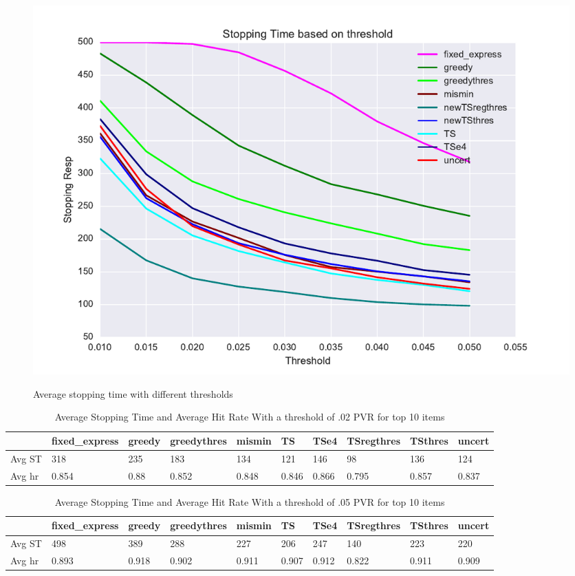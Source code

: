 \documentclass[a4paper,12pt]{article}
\begin{document}
\begin{figure}
\caption{Average stopping time with different thresholds}
\includegraphics[width=1\textwidth]{plots/stoppingtimes.pdf}
\label{fig:st}
\end{figure}
\begin{table}
\begin{center}
\begin{tabular}{llllllllll}
\hline    &  fixed\_express &  greedy &  greedythres &  mismin &    TS &  TSe4 &  TSregthres &  TSthres &  uncert \\\hline  Avg ST  & 318 &   235 & 183 & 134 & 121 & 146 & 	98 &	136 &   124 \\  Avg hr  &  0.854 &  0.88 & 0.852&0.848 & 0.846 & 	0.866 & 0.795 &0.857 &  0.837 \end{tabular}
\end{center}
\caption{Average Stopping Time and Average Hit Rate With a threshold of .02 PVR for top 10 items}
\label{table:st2}
\end{table}
\begin{table}
\begin{center}
\begin{tabular}{llllllllll}
\hline    &  fixed\_express &  greedy &  greedythres &  mismin &    TS &  TSe4 &  TSregthres &  TSthres &  uncert \\\hline    Avg ST & 498 & 389 & 288 & 227 & 206 & 247 & 140 &223 &  220 \\ Avg hr & 0.893 &0.918&0.902& 	0.911 & 0.907& 0.912 & 0.822&0.911& 0.909\end{tabular}
\end{center}
\caption{Average Stopping Time and Average Hit Rate With a threshold of .05 PVR for top 10 items}
\label{table:st5}
\end{table}
\end{document}
